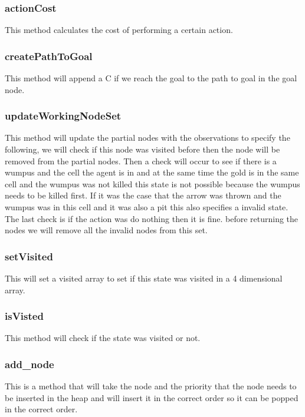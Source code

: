 		\subsubsection*{actionCost}
		This method calculates the cost of performing a certain action.
		
		\subsubsection*{createPathToGoal}
		This method will append a C if we reach the goal to the path to goal in the goal node.
		
		\subsubsection*{updateWorkingNodeSet}
		This method will update the partial nodes with the observations to specify the following, we will check if this node was visited before then the node will be removed from the partial nodes. Then a check will occur to see if there is a wumpus and the cell the agent is in and at the same time the gold is in the same cell and the wumpus was not killed this state is not possible because the wumpus needs to be killed first. If it was the case that the arrow was thrown and the wumpus was in this cell and it was also a pit this also specifies a invalid state. The last check is if the action was do nothing then it is fine. before returning the nodes we will remove all the invalid nodes from this set.
	
		\subsubsection*{setVisited}
		This will set a visited array to set if this state was visited in a 4 dimensional array.
		
		\subsubsection*{isVisted}
		This method will check if the state was visited or not.
		
		\subsubsection*{add\_node}
		This is a method that will take the node and the priority that the node needs to be inserted in the heap and will insert it in the correct order so it can be popped in the correct order.
		
